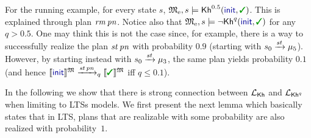 \begin{example}\label{ex:running:pkh}
  For the running example, for every state $s$,
  $\modelex, s \models \kh^{0.5}(\init,\goal)$.
  This is explained through plan $\mathit{rm}\,\mathit{pn}$.
  Notice also that $\modelex, s \models \neg \kh^q(\init,\goal)$ for
  any $q>0.5$. One may think this is not the case since, for example,
  there is a way to successfully realize the plan $\mathit{st}\,\mathit{pn}$
  with probability $0.9$ (starting with $s_0\xrightarrow{\mathit{st}}\mu_5$).
  However, by starting instead with $s_0\xrightarrow{\mathit{st}}\mu_3$, the
  same plan yields probability $0.1$ (and hence
  $\truthset{\model}{\init}\reach{\stairs\,\panic}_q\truthset{\model}{\goal}$
  iff $q\leq 0.1$).
\end{example}

In the following we show that there is strong connection between
${\mathcal{L}_{{\mathsf{Kh}}}}$ and ${\mathcal{L}_{{\mathsf{Kh}}^q}}$ when limiting to LTSs models. We first present
the next lemma which basically states that in LTS, plans that are
realizable with some probability are also realized with
probability~$1$.

